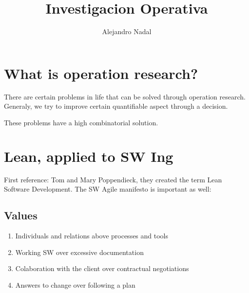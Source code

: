 \documentclass[a4paper,12pt] {article}
\begin{document}
\title{Investigacion Operativa}
\author{Alejandro Nadal}
\maketitle

\section{What is operation research?}

There are certain problems in life that can be solved through operation research. Generaly, we try to improve certain quantifiable aspect through a decision.

These problems have a high combinatorial solution.

\section{Lean, applied to SW Ing}

First reference: Tom and Mary Poppendieck, they created the term Lean Software Development. The SW Agile manifesto is important as well:

\subsection{Values}
\begin{enumerate}
\item Individuals and relations above processes and tools
\item Working SW over excessive documentation
\item Colaboration with the client over contractual negotiations
\item Answers to change over following a plan
\end{enumerate}
\end{document}
